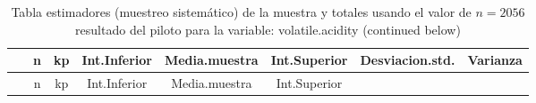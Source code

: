 \documentclass[
]{article}
\begin{document}
\begin{longtable}[]{@{}cccccccc@{}}
\caption{Tabla estimadores (muestreo sistemático) de la muestra y
totales usando el valor de \(n = 2056\) resultado del piloto para la
variable: volatile.acidity (continued below)}\tabularnewline
\toprule
\begin{minipage}[b]{0.18\columnwidth}\centering
~\strut
\end{minipage} & \begin{minipage}[b]{0.05\columnwidth}\centering
n\strut
\end{minipage} & \begin{minipage}[b]{0.03\columnwidth}\centering
kp\strut
\end{minipage} & \begin{minipage}[b]{0.10\columnwidth}\centering
Int.Inferior\strut
\end{minipage} & \begin{minipage}[b]{0.11\columnwidth}\centering
Media.muestra\strut
\end{minipage} & \begin{minipage}[b]{0.10\columnwidth}\centering
Int.Superior\strut
\end{minipage} & \begin{minipage}[b]{0.12\columnwidth}\centering
Desviacion.std.\strut
\end{minipage} & \begin{minipage}[b]{0.08\columnwidth}\centering
Varianza\strut
\end{minipage}\tabularnewline
\midrule
\endfirsthead
\toprule
\begin{minipage}[b]{0.18\columnwidth}\centering
~\strut
\end{minipage} & \begin{minipage}[b]{0.05\columnwidth}\centering
n\strut
\end{minipage} & \begin{minipage}[b]{0.03\columnwidth}\centering
kp\strut
\end{minipage} & \begin{minipage}[b]{0.10\columnwidth}\centering
Int.Inferior\strut
\end{minipage} & \begin{minipage}[b]{0.11\columnwidth}\centering
Media.muestra\strut
\end{minipage} & \begin{minipage}[b]{0.10\columnwidth}\centering
Int.Superior\strut
\end{minipage} & \begin{minipage}[b]{0.12\columnwidth}\centering

\end{minipage}
\end{longtable}
\end{document}

